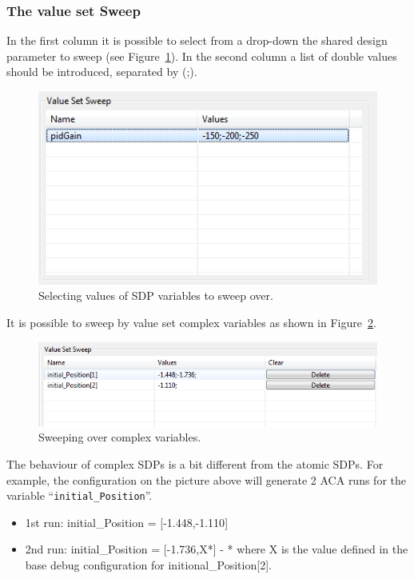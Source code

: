 \documentclass{crescendorepchap}
\begin{document}
\subsubsection{The value set Sweep}

In the first column it is possible to select from a drop-down the shared
design parameter to sweep (see Figure~\ref{fig:ValueSetSweep}). 
In the second column a list of double values
should be introduced, separated by (;).

\begin{figure}[htbp]
\centering
\includegraphics[width=.6\textwidth]{images/ValueSetSweep.PNG}
\caption{Selecting values of SDP variables to sweep over.\label{fig:ValueSetSweep}}
\end{figure}

It is possible to sweep by value set complex variables as shown in Figure~\ref{fig:ValueSetSweepComplex}.

\begin{figure}[htbp]
\centering
\includegraphics[width=.6\textwidth]{images/ValueSetSweepComplex.png}
\caption{Sweeping over complex variables.\label{fig:ValueSetSweepComplex}}
\end{figure}

The behaviour of complex SDPs is a bit different from the atomic SDPs.
For example, the configuration on the picture above will generate 2 ACA
runs for the variable ``\texttt{initial\_Position}''.

\begin{itemize}
\item 1st run: initial\_Position = {[}-1.448,-1.110{]}

\item 2nd run: initial\_Position = {[}-1.736,X*{]} - * where X is the value
defined in the base debug configuration for initional\_Position{[}2{]}.
\end{itemize}
\end{document}

